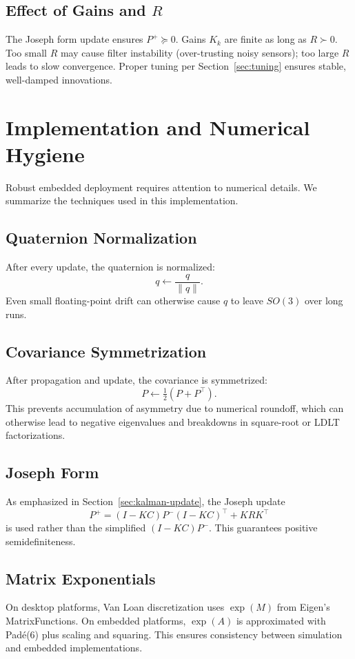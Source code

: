 \documentclass[10pt]{extarticle}
\begin{document}
\subsection{Effect of Gains and $R$}
The Joseph form update ensures $P^+\succeq 0$. Gains $K_k$ are finite as long as
$R\succ 0$. Too small $R$ may cause filter instability (over-trusting noisy sensors);
too large $R$ leads to slow convergence. Proper tuning per Section~\ref{sec:tuning} ensures
stable, well-damped innovations.


\section{Implementation and Numerical Hygiene}
\label{sec:implementation}

Robust embedded deployment requires attention to numerical details. We summarize the
techniques used in this implementation.

\subsection{Quaternion Normalization}
After every update, the quaternion is normalized:
\[
q \leftarrow \frac{q}{\|q\|}.
\]
Even small floating-point drift can otherwise cause $q$ to leave $SO(3)$ over long runs.

\subsection{Covariance Symmetrization}
After propagation and update, the covariance is symmetrized:
\[
P \leftarrow \tfrac{1}{2}(P+P^\top).
\]
This prevents accumulation of asymmetry due to numerical roundoff, which can otherwise
lead to negative eigenvalues and breakdowns in square-root or LDLT factorizations.

\subsection{Joseph Form}
As emphasized in Section~\ref{sec:kalman-update}, the Joseph update
\[
P^+ = (I-KC)P^-(I-KC)^\top + KRK^\top
\]
is used rather than the simplified $(I-KC)P^-$. This guarantees positive semidefiniteness.

\subsection{Matrix Exponentials}
On desktop platforms, Van Loan discretization uses $\exp(M)$ from Eigen’s MatrixFunctions.
On embedded platforms, $\exp(A)$ is approximated with Pad\'e(6) plus scaling and squaring.
This ensures consistency between simulation and embedded implementations.
\end{document}
